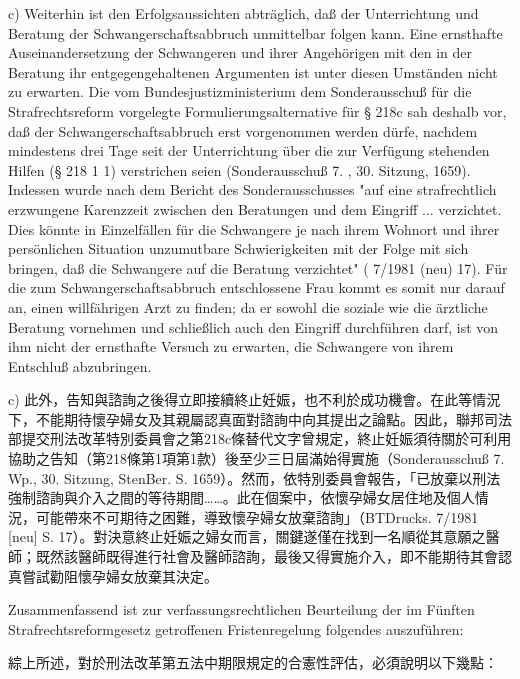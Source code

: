 \documentclass[12pt]{article}
\begin{document}
\syncleft
\begin{sourcepara}
c) Weiterhin ist den Erfolgsaussichten abträglich, daß der Unterrichtung und Beratung der Schwangerschaftsabbruch unmittelbar folgen kann. Eine ernsthafte Auseinandersetzung der Schwangeren und ihrer Angehörigen mit den in der Beratung ihr entgegengehaltenen Argumenten ist unter diesen Umständen nicht zu erwarten. Die vom Bundesjustizministerium dem Sonderausschuß für die Strafrechtsreform vorgelegte Formulierungsalternative für § 218c sah deshalb vor, daß der Schwangerschaftsabbruch erst vorgenommen werden dürfe, nachdem mindestens drei Tage seit der Unterrichtung über die zur Verfügung stehenden Hilfen (§ 218 \abbrAbs{} 1 \abbrNr{} 1) verstrichen seien (Sonderausschuß 7. \abbrWp{}, 30. Sitzung, \abbrStenBer{} \abbrS{} 1659). Indessen wurde nach dem Bericht des Sonderausschusses "auf eine strafrechtlich erzwungene Karenzzeit zwischen den Beratungen und dem Eingriff ... verzichtet. Dies könnte in Einzelfällen für die Schwangere je nach ihrem Wohnort und ihrer persönlichen Situation unzumutbare Schwierigkeiten mit der Folge mit sich bringen, daß die Schwangere auf die Beratung verzichtet" (\abbrBTDrucks{} 7/1981 (neu) \abbrS{} 17). Für die zum Schwangerschaftsabbruch entschlossene Frau kommt es somit nur darauf an, einen willfährigen Arzt zu finden; da er sowohl die soziale wie die ärztliche Beratung vornehmen und schließlich auch den Eingriff durchführen darf, ist von ihm nicht der ernsthafte Versuch zu erwarten, die Schwangere von ihrem Entschluß abzubringen.
\end{sourcepara}
\begin{transpara}
c) 此外，告知與諮詢之後得立即接續終止妊娠，也不利於成功機會。在此等情況下，不能期待懷孕婦女及其親屬認真面對諮詢中向其提出之論點。因此，聯邦司法部提交刑法改革特別委員會之第218c條替代文字曾規定，終止妊娠須待關於可利用協助之告知（第218條第1項第1款）後至少三日屆滿始得實施（Sonderausschuß 7. Wp., 30. Sitzung, StenBer. S. 1659）。然而，依特別委員會報告，「已放棄以刑法強制諮詢與介入之間的等待期間……。此在個案中，依懷孕婦女居住地及個人情況，可能帶來不可期待之困難，導致懷孕婦女放棄諮詢」（BTDrucks. 7/1981 [neu] S. 17）。對決意終止妊娠之婦女而言，關鍵遂僅在找到一名順從其意願之醫師；既然該醫師既得進行社會及醫師諮詢，最後又得實施介入，即不能期待其會認真嘗試勸阻懷孕婦女放棄其決定。
\end{transpara}

\syncleft
\begin{sourcepara}
Zusammenfassend ist zur verfassungsrechtlichen Beurteilung der im Fünften Strafrechtsreformgesetz getroffenen Fristenregelung folgendes auszuführen:
\end{sourcepara}
\begin{transpara}
綜上所述，對於刑法改革第五法中期限規定的合憲性評估，必須說明以下幾點：
\end{transpara}
\end{document}
